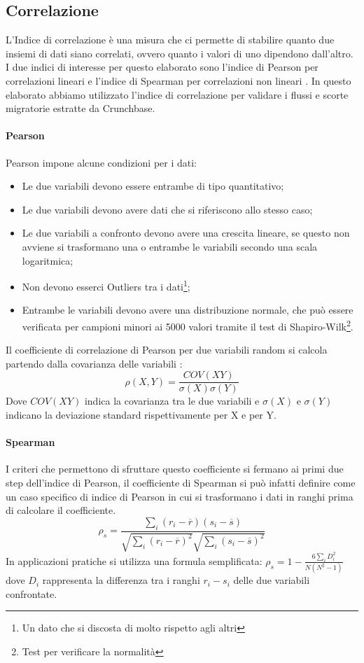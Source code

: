 \subsection{Correlazione}
L'Indice di correlazione è una misura che ci permette di stabilire quanto due insiemi di dati siano correlati, ovvero quanto i valori di uno dipendono dall'altro. 
I due indici di interesse per questo elaborato sono l'indice di Pearson per correlazioni lineari \cite{pearson} e l'indice di Spearman per correlazioni non lineari \cite{10.2307/2284441}. In questo elaborato abbiamo utilizzato l'indice di correlazione per validare i flussi e scorte migratorie estratte da Crunchbase.

\paragraph{Pearson}
Pearson impone alcune condizioni per i dati:
\begin{itemize}
\item Le due variabili devono essere entrambe di tipo quantitativo;
\item Le due variabili devono avere dati che si riferiscono allo stesso caso;
\item Le due variabili a confronto devono avere una crescita lineare, se questo non avviene si trasformano una o entrambe le variabili secondo una scala logaritmica;
\item Non devono esserci Outliers tra i dati\footnote{Un dato che si discosta di molto rispetto agli altri};
\item Entrambe le variabili devono avere una distribuzione normale, che può essere verificata per campioni minori ai 5000 valori tramite il test di Shapiro-Wilk\footnote{Test per verificare la normalità}.
\end{itemize}
Il coefficiente di correlazione di Pearson per due variabili random si calcola partendo dalla covarianza delle variabili  :
\[\rho(X,Y)  = \frac{COV(XY)}{\sigma(X) \sigma(Y)}\]
Dove \(COV(XY)\) indica la covarianza tra le due variabili e \(\sigma(X)\) e \(\sigma(Y)\) indicano la deviazione standard rispettivamente per X e per Y.


\paragraph{Spearman}
 I criteri che permettono di sfruttare questo coefficiente si fermano ai primi due step dell'indice di Pearson, il coefficiente di Spearman si può infatti definire come un caso specifico di indice di Pearson in cui si trasformano i dati in ranghi prima di calcolare il coefficiente. 
\[\rho _{s}={\frac {\sum _{i}(r_{i}-{\overline {r}})(s_{i}-{\overline {s}})}{{\sqrt {\sum _{i}(r_{i}-{\overline {r}})^{2}}}{\sqrt {\sum _{i}(s_{i}-{\overline {s}})^{2}}}}}\]
In applicazioni pratiche si utilizza una formula semplificata: \(\rho _{s}=1-{\frac {6\sum _{i}D_{i}^{2}}{N(N^{2}-1)}}\) dove \(D_i\) rappresenta la differenza tra i ranghi \(r_{i}-s_{i}\) delle due variabili confrontate. \\

